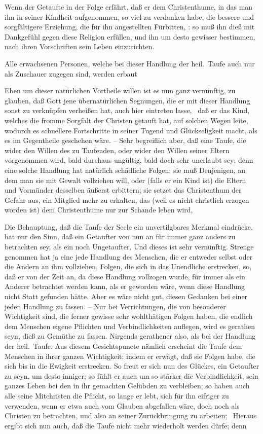 \begin{aufza}
\begin{aufzb}
\item Wenn der Getaufte in der Folge erfährt, daß er dem Christenthume, in das man ihn in seiner Kindheit aufgenommen, so viel zu verdanken habe, die bessere und sorgfältigere Erziehung, die für ihn angestellten Fürbitten, \usw : so muß ihn dieß mit Dankgefühl gegen diese Religion erfüllen, und ihn um desto gewisser bestimmen, nach ihren Vorschriften sein Leben einzurichten.
\item Alle erwachsenen Personen, welche bei dieser Handlung der heil.\ Taufe auch nur als Zuschauer zugegen sind, werden erbaut \usw\
\end{aufzb}
Eben um dieser natürlichen Vortheile willen ist es nun ganz vernünftig, zu glauben, daß Gott jene übernatürlichen Segnungen, die er mit dieser Handlung sonst zu verknüpfen verheißen hat, auch hier eintreten lasse, \dh\  daß er das Kind, welches die fromme Sorgfalt der Christen getauft hat, auf solchen Wegen leite, wodurch es schnellere Fortschritte in seiner Tugend und Glückseligkeit macht, als es im Gegentheile geschehen wäre. -- Sehr begreiflich aber, daß eine Taufe, die wider den Willen des zu Taufenden, oder wider den Willen seiner Eltern vorgenommen wird, bald durchaus ungültig, bald doch sehr unerlaubt sey; denn eine solche Handlung hat natürlich schädliche Folgen; sie muß Denjenigen, an dem man sie mit Gewalt vollziehen will, oder (falls er ein Kind ist) die Eltern und Vormünder desselben äußerst erbittern; sie setzet das Christenthum der Gefahr aus, ein Mitglied mehr zu erhalten, das (weil es nicht christlich erzogen worden ist) dem Christenthume nur zur Schande leben wird, \usw\
\item Die Behauptung, daß die Taufe der Seele ein unvertilgbares Merkmal eindrücke, hat nur den Sinn, daß ein Getaufter von nun an für immer ganz anders zu betrachten sey, als ein noch Ungetaufter. Und dieses ist sehr vernünftig. Strenge genommen hat ja eine jede Handlung des Menschen, die er entweder selbst oder die Andern an ihm vollziehen, Folgen, die sich in das Unendliche erstrecken, so, daß er von der Zeit an, da diese Handlung vollzogen wurde, für immer als ein Anderer betrachtet werden kann, als er geworden wäre, wenn diese Handlung nicht Statt gefunden hätte. Aber es wäre nicht gut, diesen Gedanken bei einer jeden Handlung zu fassen. -- Nur bei Verrichtungen, die von besonderer Wichtigkeit sind, die ferner gewisse sehr wohlthätigen Folgen haben, die endlich dem Menschen eigene Pflichten und Verbindlichkeiten auflegen, wird es gerathen seyn, dieß zu Gemüthe zu fassen. Nirgends gerathener also, als bei der Handlung der heil.\ Taufe. Aus diesem Gesichtspuncte nämlich erscheint die Taufe dem Menschen in ihrer ganzen Wichtigkeit; indem er erwägt, daß sie Folgen habe, die sich bis in die Ewigkeit erstrecken. So freut er sich nun des Glückes, ein Getaufter zu seyn, um desto inniger; so fühlt er auch um so stärker die Verbindlichkeit, sein ganzes Leben bei den in ihr gemachten Gelübden zu verbleiben; so haben auch alle seine Mitchristen die Pflicht, so lange er lebt, sich für ihn eifriger zu verwenden, wenn er etwa auch vom Glauben abgefallen wäre, doch noch als Christen zu betrachten, und also an seiner Zurückbringung zu arbeiten; \usw\ Hieraus ergibt sich nun auch, daß die Taufe nicht mehr wiederholt werden dürfe; denn

\end{aufza}
